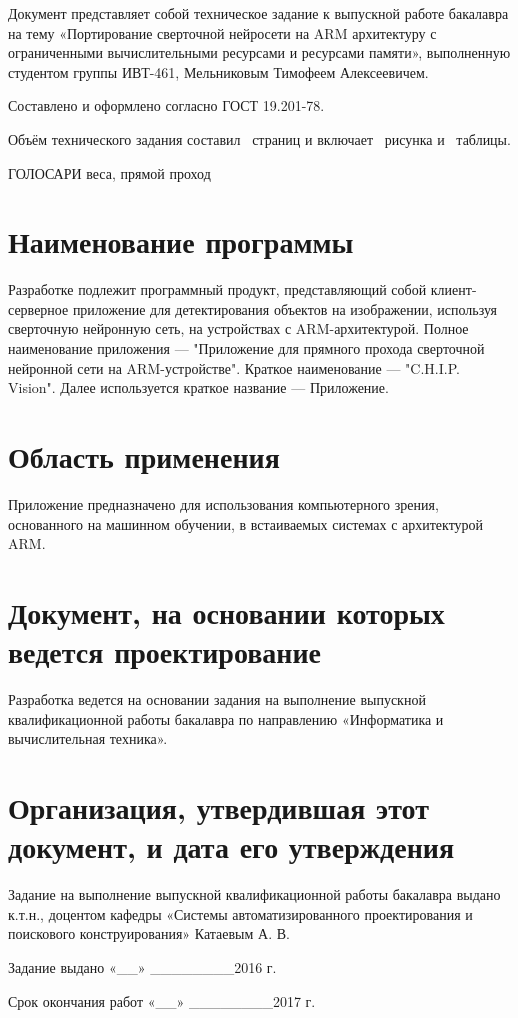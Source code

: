 \documentclass[a4paper,english]{G2-105}
\begin{document}
\par Документ представляет собой техническое задание к выпускной работе бакалавра на тему «Портирование сверточной нейросети на ARM архитектуру с ограниченными вычислительными ресурсами и ресурсами памяти», выполненную студентом группы ИВТ-461, Мельниковым Тимофеем Алексеевичем.
\par Составлено и оформлено согласно ГОСТ 19.201-78.
\par Объём технического задания составил \totalpages~страниц и включает \totalfigures~рисунка и \totaltables~таблицы. 
\VSTUInitializeTZ
\tableofcontents
\newpage

\par ГОЛОСАРИ веса, прямой проход


\section{Наименование программы}
\par Разработке подлежит программный продукт, представляющий собой клиент-серверное приложение для детектирования объектов на изображении, используя сверточную нейронную сеть, на устройствах с ARM-архитектурой.
Полное наименование приложения --- "Приложение для прямного прохода сверточной нейронной сети на ARM-устройстве". Краткое наименование --- "C.H.I.P. Vision". Далее используется краткое название --- Приложение.

\section{Область применения}
\par Приложение предназначено для использования компьютерного зрения, основанного на машинном обучении, в встаиваемых системах с архитектурой ARM.

\ttl
\section{Документ, на основании которых ведется проектирование}
\par Разработка ведется на основании задания на выполнение выпускной квалификационной работы бакалавра по направлению «Информатика и вычислительная техника».

\section{Организация, утвердившая этот документ, и дата его утверждения}
Задание на выполнение выпускной квалификационной работы бакалавра выдано к.т.н., доцентом кафедры «Системы автоматизированного проектирования и поискового конструирования» Катаевым А. В.
\par Задание выдано «\_\_» \_\_\_\_\_\_\_\_2016 г.
\par Срок окончания работ «\_\_» \_\_\_\_\_\_\_\_2017 г.
\end{document}
